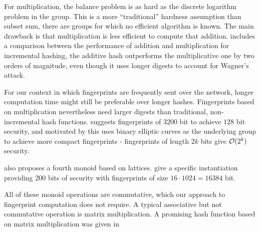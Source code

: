 For multiplication, the balance problem is as hard as the discrete logarithm problem in the group. This is a more ``traditional'' hardness assumption than subset sum, there are groups for which no efficient algorithm is known. The main drawback is that multiplication is less efficient to compute that addition. \cite{stanton2010fastad} includes a comparison between the performance of addition and multiplication for incremental hashing, the additive hash outperforms the multiplicative one by two orders of magnitude, even though it uses longer digests to account for Wagner's attack.

For our context in which fingerprints are frequently sent over the network, longer computation time might still be preferable over longer hashes. Fingerprints based on multiplication nevertheless need larger digests than traditional, non-incremental hash functions. \cite{maitin2017elliptic} suggests fingerprints of $3200$ bit to achieve $128$ bit security, and motivated by this uses binary elliptic curves as the underlying group to achieve more compact fingerprints - fingerprints of length $2k$ bits give $\mathcal{O}(2^k)$ security.

\cite{bellare1997new} also proposes a fourth monoid based on lattices. \cite{lewi2019securing} give a specific instantiation providing 200 bits of security with fingerprints of size $16 \cdot 1024 = 16384$ bit.

All of these monoid operations are commutative, which our approach to fingerprint computation does not require. A typical associative but not commutative operation is matrix multiplication. A promising hash function based on matrix multiplication was given in \cite{}


















































